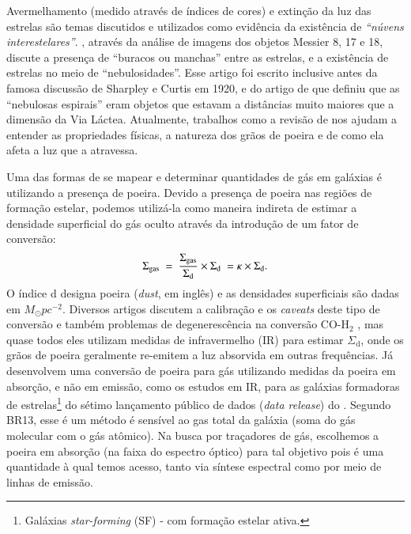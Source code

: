 Avermelhamento (medido através de índices de cores) e extinção da luz das estrelas são temas
discutidos e utilizados como evidência da existência de {\em ``núvens interestelares''}.
\citet{Barnard.1908a}, através da análise de imagens dos objetos Messier 8, 17 e 18, discute a
presença de ``buracos ou manchas'' entre as estrelas, e a existência de estrelas no meio de
``nebulosidades''. Esse artigo foi escrito inclusive antes da famosa discussão de Sharpley e Curtis
em 1920, e do artigo de \citet{Hubble.1925a} que definiu que as ``nebulosas espirais'' eram objetos
que estavam a distâncias muito maiores que a dimensão da Via Láctea. Atualmente, trabalhos como a
revisão de \citet{Draine.2003a} nos ajudam a entender as propriedades físicas, a natureza dos
grãos de poeira e de como ela afeta a luz que a atravessa.

Uma das formas de se mapear e determinar quantidades de gás em galáxias é utilizando a presença de
poeira. Devido a presença de poeira nas regiões de formação estelar, podemos utilizá-la como maneira
indireta de estimar a densidade superficial do gás oculto através da introdução de um fator de
conversão:
\begin{equation}
	\label{eq:dust2gas}
	\Sigma_{\mathrm{gas}}\ =\ \frac{\Sigma_{\mathrm{gas}}}{\Sigma_{\mathrm{d}}} \times \Sigma_{\mathrm{d}}\ = \kappa \times \Sigma_{\mathrm{d}}. 
\end{equation}
\noindent O índice d designa poeira ({\em dust}, em inglês) e as densidades superficiais são dadas
em $M_\odot pc^{-2}$. Diversos artigos discutem a calibração e os {\em caveats} deste tipo de
conversão e também problemas de degenerescência na conversão CO-$\mathrm{H}_2$ \citep{Guiderdoni.Rocca.1987,
Leroy.etal.2011a, Leroy.etal.2013a, RemyRuyer.etal.2014a}, mas quase todos eles utilizam medidas de
infravermelho (IR) para estimar $\Sigma_{\mathrm{d}}$, onde os grãos de poeira geralmente
re-emitem a luz absorvida em outras frequências. Já \citet[][BR13 daqui em
diante]{Brinchmann.etal.2013a} desenvolvem uma conversão de poeira para gás utilizando medidas da
poeira em absorção, e não em emissão, como os estudos em IR, para as galáxias formadoras de
estrelas\footnote{Galáxias {\em star-forming} (SF) - com formação estelar ativa.} do sétimo
lançamento público de dados ({\em data release}) do \SDSS \citep[][DR7]{Abazajian.etal.2009a}.
Segundo BR13, esse é um método é sensível ao gas total da galáxia (soma do gás molecular com o gás
atômico). Na busca por traçadores de gás, escolhemos a poeira em absorção (na faixa do espectro
óptico) para tal objetivo pois é uma quantidade à qual temos acesso, tanto via síntese espectral
como por meio de linhas de emissão.


